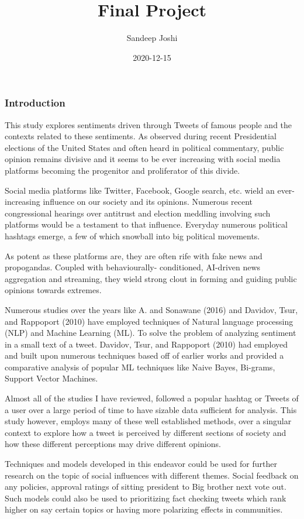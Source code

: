 \documentclass[
]{article}
\title{Final Project}
\author{Sandeep Joshi}
\date{2020-12-15}
\begin{document}
\maketitle

\hypertarget{introduction}{%
\subsubsection{Introduction}\label{introduction}}

This study explores sentiments driven through Tweets of famous people
and the contexts related to these sentiments. As observed during recent
Presidential elections of the United States and often heard in political
commentary, public opinion remains divisive and it seems to be ever
increasing with social media platforms becoming the progenitor and
proliferator of this divide.

Social media platforms like Twitter, Facebook, Google search, etc. wield
an ever-increasing influence on our society and its opinions. Numerous
recent congressional hearings over antitrust and election meddling
involving such platforms would be a testament to that influence.
Everyday numerous political hashtags emerge, a few of which snowball
into big political movements.

As potent as these platforms are, they are often rife with fake news and
propogandas. Coupled with behaviourally- conditioned, AI-driven news
aggregation and streaming, they wield strong clout in forming and
guiding public opinions towards extremes.

Numerous studies over the years like A. and Sonawane (2016) and Davidov,
Tsur, and Rappoport (2010) have employed techniques of Natural language
processing (NLP) and Machine Learning (ML). To solve the problem of
analyzing sentiment in a small text of a tweet. Davidov, Tsur, and
Rappoport (2010) had employed and built upon numerous techniques based
off of earlier works and provided a comparative analysis of popular ML
techniques like Naive Bayes, Bi-grams, Support Vector Machines.

Almost all of the studies I have reviewed, followed a popular hashtag or
Tweets of a user over a large period of time to have sizable data
sufficient for analysis. This study however, employs many of these well
established methods, over a singular context to explore how a tweet is
perceived by different sections of society and how these different
perceptions may drive different opinions.

Techniques and models developed in this endeavor could be used for
further research on the topic of social influences with different
themes. Social feedback on any policies, approval ratings of sitting
president to Big brother next vote out. Such models could also be used
to prioritizing fact checking tweets which rank higher on say certain
topics or having more polarizing effects in communities.
\end{document}
